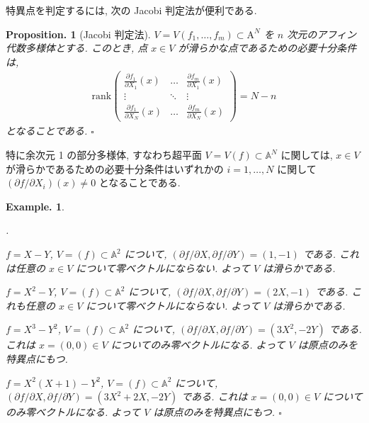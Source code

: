 \documentclass[openany, a4paper, oneside]{jsbook}
\newcounter{enum2}
\renewenvironment{enumerate}{%
\begin{list}%
{%
\arabic{enum2}.\ \,%
}%
{%
\usecounter{enum2}
\setlength{\itemindent}{0pt}%
\setlength{\leftmargin}{15pt}%
\setlength{\rightmargin}{0pt}%
\setlength{\labelsep}{0pt}%
\setlength{\labelwidth}{6pt}%
\setlength{\itemsep}{0pt}%
\setlength{\parsep}{0pt}%
\setlength{\listparindent}{0pt}%
}
}{%
\end{list}%
}
\theoremstyle{break}
\theoremstyle{breakdefn}
\newtheorem{prop}[thm]{Proposition.}
\newtheorem{ex}[thm]{Example.}
\newcommand{\fin}{\hfill $\square$ \par}
\begin{document}
特異点を判定するには, 次の Jacobi 判定法が便利である.
\begin{prop}[Jacobi 判定法]
 $V = V (f_1,\dots,f_m) \subset \mathrm{A}^N$ を $n$ 次元のアフィン代数多様体とする.
 このとき, 点 $x \in V$ が滑らかな点であるための必要十分条件は,
 \begin{align}
  \mathrm{rank} \left(
  \begin{array}{ccc}
   \frac{\partial f_1}{\partial X_1}(x) & \ldots &  \frac{\partial f_m}{\partial X_1}(x) \\
   \vdots & \ddots & \vdots \\
   \frac{\partial f_1}{\partial X_N}(x) & \ldots & \frac{\partial f_m}{\partial X_N}(x)
  \end{array}
  \right)
  =
  N -n
 \end{align}
 となることである. \fin
\end{prop}

特に余次元 1 の部分多様体, すなわち超平面 $V=V (f) \subset \mathbb{A}^N$ に関しては,
$x \in V$ が滑らかであるための必要十分条件はいずれかの $i=1, \dots, N$ に関して $(\partial f / \partial X_i) (x) \neq 0$ となることである.
\begin{ex}
\begin{enumerate}
\item $f=X-Y$, $V=(f) \subset \mathbb{A}^2$ について,
   $(\partial f/\partial X, \partial f/\partial Y) = (1, -1)$ である.
   これは任意の $x \in V$ について零ベクトルにならない.
   よって $V$ は滑らかである.
\item $f=X^2-Y$, $V=(f) \subset \mathbb{A}^2$ について, $(\partial f/\partial X, \partial f/\partial Y) = (2X , -1)$ である.
   これも任意の $x \in V$ について零ベクトルにならない.
   よって $V$ は滑らかである.
\item $f=X^3-Y^2$, $V=(f) \subset \mathbb{A}^2$ について,
   $(\partial f/\partial X, \partial f/\partial Y) = (3X^2 , -2Y)$ である.
   これは $x = (0,0)  \in V$ についてのみ零ベクトルになる.
   よって $V$ は原点のみを特異点にもつ.
\item $f=X^2 (X+1)-Y^2$, $V=(f) \subset \mathbb{A}^2$ について,
   $(\partial f / \partial X, \partial f/\partial Y) = (3X^2+2X , -2Y)$ である.
   これは $x = (0,0) \in V$ についてのみ零ベクトルになる.
   よって $V$ は原点のみを特異点にもつ. \fin
\end{enumerate}
\end{ex}
\end{document}
